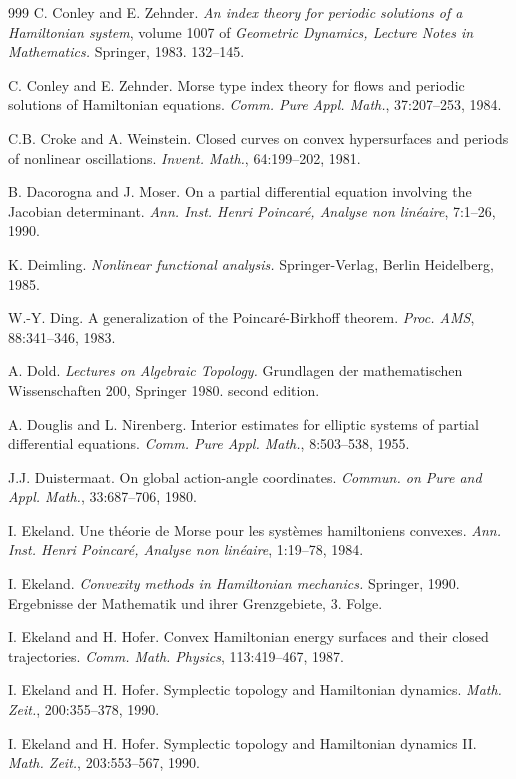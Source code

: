 \begin{thebibliography}{999}
 C. Conley and E. Zehnder. \emph{An index theory for periodic
solutions of a Hamiltonian system}, volume 1007 of \emph{Geometric
Dynamics, Lecture Notes in Mathematics.} Springer, 1983. 132--145.

 C. Conley and E. Zehnder. Morse type index theory for flows
and periodic solutions of Hamiltonian equations.
\emph{Comm. Pure Appl. Math.}, 37:207--253, 1984.

 C.B. Croke and A. Weinstein. Closed curves on convex
hypersurfaces and periods of nonlinear oscillations.
\emph{Invent. Math.}, 64:199--202, 1981.

 B. Dacorogna and J. Moser. On a partial differential equation
involving the Jacobian determinant. \emph{Ann. Inst. Henri Poincaré,
Analyse non linéaire}, 7:1--26, 1990.

 K. Deimling. \emph{Nonlinear functional analysis.}
Springer-Verlag, Berlin Heidelberg, 1985.

 W.-Y. Ding. A generalization of the Poincaré-Birkhoff theorem.
\emph{Proc. AMS}, 88:341--346, 1983.

 A. Dold. \emph{Lectures on Algebraic Topology.} Grundlagen
der mathematischen Wissenschaften 200, Springer 1980. second edition.

 A. Douglis and L. Nirenberg. Interior estimates for elliptic
systems of partial differential equations. \emph{Comm. Pure Appl. Math.},
8:503--538, 1955.

 J.J. Duistermaat. On global action-angle coordinates.
\emph{Commun. on Pure and Appl. Math.}, 33:687--706, 1980.

 I. Ekeland. Une théorie de Morse pour les systèmes
hamiltoniens convexes. \emph{Ann. Inst. Henri Poincaré, Analyse non
linéaire}, 1:19--78, 1984.

 I. Ekeland. \emph{Convexity methods in Hamiltonian
mechanics.} Springer, 1990. Ergebnisse der Mathematik und ihrer
Grenzgebiete, 3. Folge.

 I. Ekeland and H. Hofer. Convex Hamiltonian energy surfaces
and their closed trajectories. \emph{Comm. Math. Physics}, 113:419--467,
1987.

 I. Ekeland and H. Hofer. Symplectic topology and Hamiltonian
dynamics. \emph{Math. Zeit.}, 200:355--378, 1990.

 I. Ekeland and H. Hofer. Symplectic topology and Hamiltonian
dynamics II. \emph{Math. Zeit.}, 203:553--567, 1990.


\end{thebibliography}

